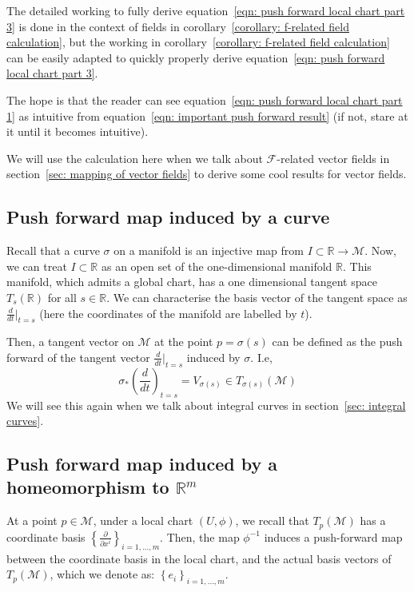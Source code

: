     The detailed working to fully derive equation~\ref{eqn: push forward
    local chart part 3} is done in the context of fields in
    corollary~\ref{corollary: f-related field calculation}, but the working
    in corollary~\ref{corollary: f-related field calculation} can be easily
    adapted to quickly properly derive equation~\ref{eqn: push forward
    local chart part 3}.

    The hope is that the reader can see equation~\ref{eqn: push forward
    local chart part 1} as intuitive from equation~\ref{eqn: important push
    forward result} (if not, stare at it until it becomes intuitive).
    
    We will use the calculation here when we talk about
    $\mathcal{F}$-related vector fields in section~\ref{sec: mapping
    of vector fields} to derive some cool results for vector fields.
  \subsection{Push forward map induced by a curve}
    \label{subsec: push forward induced by a curve}
    Recall that a curve $\sigma$ on a manifold is an injective map from $I
    \subset \mathbb{R} \rightarrow \mathcal{M}$. Now, we can treat $I
    \subset \mathbb{R}$ as an open set of the one-dimensional manifold
    $\mathbb{R}$. This manifold, which admits a global chart, has a one
    dimensional tangent space $T_s(\mathbb{R})$ for all $s \in \mathbb{R}$.
    We can characterise the basis vector of the tangent space as
    $\frac{d}{dt}\Bigr|_{t=s}$ (here the coordinates of the manifold are
    labelled by $t$).

    Then, a tangent vector on $\mathcal{M}$ at the point $p = \sigma(s)$
    can be defined as the push forward of the tangent vector $\frac{d}{dt}\Bigr|_{t=s}$ induced by $\sigma$. I.e,
    \begin{equation}
      \sigma_{*}\left(\frac{d}{dt}\right)_{t = s} = V_{\sigma(s)} \in
      T_{\sigma(s)}(\mathcal{M})
    \end{equation}
    We will see this again when we talk about integral curves in
    section~\ref{sec: integral curves}.
  \subsection{Push forward map induced by a homeomorphism to
  $\mathbb{R}^m$}
    \label{subsec: push forward map induced by a homeomorphism}
    At a point $p \in \mathcal{M}$, under a local chart $(U,\phi)$, we
    recall that $T_p(\mathcal{M})$ has a coordinate basis
    $\left\{\frac{\partial}{\partial x^i}\right\}_{i = 1,...,m}$. Then, the
    map $\phi^{-1}$ induces a push-forward map between the coordinate basis
    in the local chart, and the actual basis vectors of $T_p(\mathcal{M})$,
    which we denote as: $\left\{e_i\right\}_{i = 1,...,m}$.